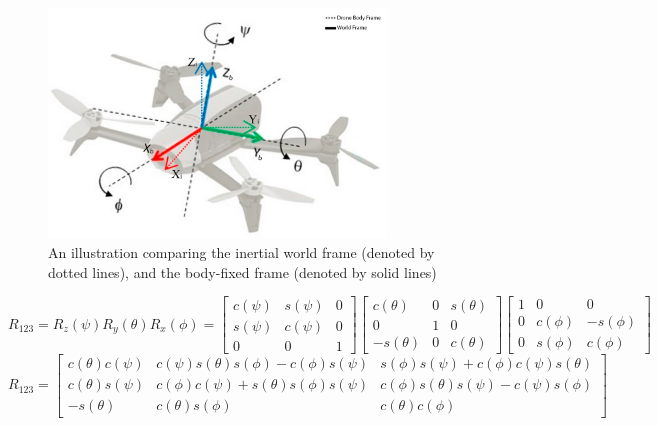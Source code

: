 \documentclass[letterpaper, preprint, paper,11pt]{AAS}	%
\begin{document}
\begin{figure}[htb]
	\centering\includegraphics[width=0.8\textwidth]{Figures/DroneFrame}
	\caption{An illustration comparing the inertial world frame (denoted by dotted lines), and the body-fixed frame (denoted by solid lines)}
	\label{fig:DroneFrame}
\end{figure}

\begin{equation}
\label{eq:R}
R_{123} = R_z(\psi)R_y(\theta)R_x(\phi) = \begin{bmatrix}
c(\psi) & s(\psi) & 0 \\
s(\psi) & c(\psi) & 0 \\
0 & 0 & 1
\end{bmatrix}
\begin{bmatrix}
c(\theta) & 0 & s(\theta) \\
0 & 1 & 0 \\
-s(\theta) & 0 & c(\theta)
\end{bmatrix}
\begin{bmatrix}
1&0&0\\
0&c(\phi)&-s(\phi)\\
0&s(\phi)&c(\phi)
\end{bmatrix}
\end{equation}
\begin{equation}
R_{123}
=
\begin{bmatrix}
c(\theta)c(\psi) & c(\psi)s(\theta)s(\phi) - c(\phi)s(\psi) & s(\phi)s(\psi) + c(\phi)c(\psi)s(\theta) \\
c(\theta)s(\psi) & c(\phi)c(\psi) + s(\theta)s(\phi)s(\psi) & c(\phi)s(\theta)s(\psi) - c(\psi)s(\phi) \\
-s(\theta) & c(\theta)s(\phi) & c(\theta)c(\phi) 
\end{bmatrix}
\end{equation}
\end{document}
